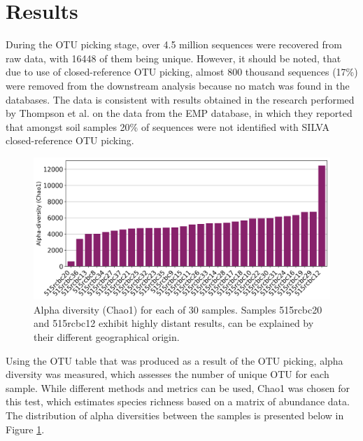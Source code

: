 \documentclass[12pt,twocolumn]{article} %
\begin{document}
\section{Results} 
During the OTU picking stage, over 4.5 million sequences were recovered from raw data, with 16448 of them being unique. However, it should be noted, that due to use of closed-reference OTU picking, almost 800 thousand sequences (17\%) were removed from the downstream analysis because no match was found in the databases. The data is consistent with results obtained in the research performed by Thompson et al.\cite{Thompson2017} on the data from the EMP database, in which they reported that amongst soil samples 20\% of sequences were not identified with SILVA closed-reference OTU picking.
\begin{figure}[ht!] %
	\includegraphics[width=\linewidth]{chao1_alpha.png}
	\caption{Alpha diversity (Chao1) for each of 30 samples. Samples 515rcbc20 and 515rcbc12 exhibit highly distant results, can be explained by their different geographical origin.}
	\label{fig:alpha_diversity}
\end{figure}
\par
Using the OTU table that was produced as a result of the OTU picking, alpha diversity was measured, which assesses the number of unique OTU for each sample. While different methods and metrics can be used, Chao1 was chosen for this test, which estimates species richness based on a matrix of abundance data. The distribution of alpha diversities between the samples is presented below in Figure \ref{fig:alpha_diversity}.
\end{document}
